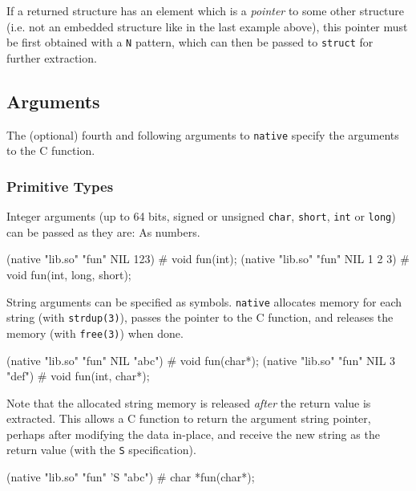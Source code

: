 If a returned structure has an element which is a \emph{pointer} to some
other structure (i.e. not an embedded structure like in the last example
above), this pointer must be first obtained with a \texttt{N} pattern,
which can then be passed to \texttt{struct} for further extraction.


\subsection{Arguments}
\label{sec:native-arguments}

The (optional) fourth and following arguments to \texttt{native} specify
the arguments to the C function.

\subsubsection{Primitive Types}
\label{sec:native-primitive-types}

Integer arguments (up to 64 bits, signed or unsigned \texttt{char},
\texttt{short}, \texttt{int} or \texttt{long}) can be passed as they
are: As numbers.

\begin{wideverbatim}
(native "lib.so" "fun" NIL 123)        # void fun(int);
(native "lib.so" "fun" NIL 1 2 3)      # void fun(int, long, short);
\end{wideverbatim}

String arguments can be specified as symbols. \texttt{native} allocates
memory for each string (with \texttt{strdup(3)}), passes the pointer to
the C function, and releases the memory (with \texttt{free(3)}) when
done.

\begin{wideverbatim}
(native "lib.so" "fun" NIL "abc")      # void fun(char*);
(native "lib.so" "fun" NIL 3 "def")    # void fun(int, char*);
\end{wideverbatim}

Note that the allocated string memory is released \emph{after} the
return value is extracted. This allows a C function to return the
argument string pointer, perhaps after modifying the data in-place, and
receive the new string as the return value (with the \texttt{S}
specification).

\begin{wideverbatim}
(native "lib.so" "fun" 'S "abc")       # char *fun(char*);
\end{wideverbatim}

